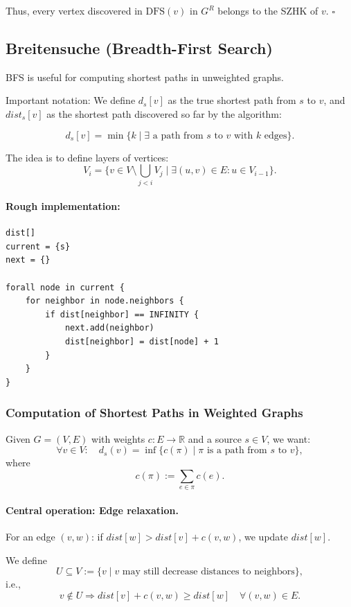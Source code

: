 \documentclass{article}
\begin{document}
\noindent
Thus, every vertex discovered in $\text{DFS}(v)$ in $G^R$ belongs to the SZHK of $v$. \hfill $\square$

\subsection{Breitensuche (Breadth-First Search)}
BFS is useful for computing shortest paths in unweighted graphs.

Important notation: We define $d_s[v]$ as the true shortest path from $s$ to $v$, and $dist_s[v]$ as the shortest path discovered so far by the algorithm:

\[
d_s[v] = \min\{ k \mid \exists \text{ a path from } s \text{ to } v \text{ with } k \text{ edges} \}.
\]

The idea is to define layers of vertices:
\[
V_i = \{ v \in V \setminus \bigcup_{j<i} V_j \mid \exists (u,v) \in E : u \in V_{i-1} \}.
\]

\paragraph{Rough implementation:}
\begin{verbatim}
dist[]
current = {s}
next = {}

forall node in current {
    for neighbor in node.neighbors {
        if dist[neighbor] == INFINITY {
            next.add(neighbor)
            dist[neighbor] = dist[node] + 1
        }
    }
}
\end{verbatim}

\subsubsection{Computation of Shortest Paths in Weighted Graphs}

Given $G=(V,E)$ with weights $c: E \rightarrow \mathbb{R}$ and a source $s \in V$,  
we want:
\[
\forall v \in V: \quad d_s(v) = \inf\{ c(\pi) \mid \pi \text{ is a path from } s \text{ to } v \},
\]
where 
\[
c(\pi) := \sum_{e \in \pi} c(e).
\]

\paragraph{Central operation: Edge relaxation.}  
For an edge $(v,w)$: if $dist[w] > dist[v] + c(v,w)$, we update $dist[w]$.

We define
\[
U \subseteq V := \{ v \mid v \text{ may still decrease distances to neighbors} \},
\]
i.e.,
\[
v \notin U \Rightarrow dist[v] + c(v,w) \geq dist[w] \quad \forall (v,w) \in E.
\]
\end{document}
